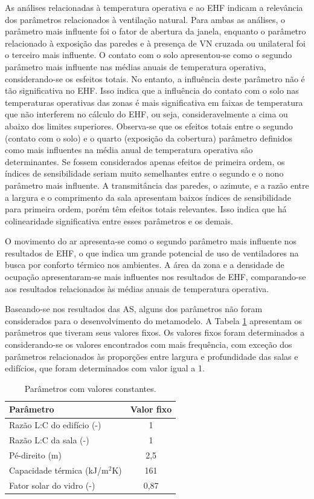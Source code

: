 \documentclass[brazil,hardcopy,openany,a4paper]{ufscthesis}
\begin{document}
	As análises relacionadas à temperatura operativa e ao EHF indicam a relevância dos parâmetros relacionados à ventilação natural. Para ambas as análises, o parâmetro mais influente foi o fator de abertura da janela, enquanto o parâmetro relacionado à exposição das paredes e à presença de VN cruzada ou unilateral foi o terceiro mais influente. 
	O contato com o solo apresentou-se como o segundo parâmetro mais influente nas médias anuais de temperatura operativa, considerando-se os esfeitos totais. No entanto, a influência deste parâmetro não é tão significativa no EHF. Isso indica que a influência do contato com o solo nas temperaturas operativas das zonas é mais significativa em faixas de temperatura que não interferem no cálculo do EHF, ou seja, consideravelmente a cima ou abaixo dos limites superiores.
	Observa-se que os efeitos totais entre o segundo (contato com o solo) e o quarto (exposição da cobertura) parâmetro definidos como mais influentes na média anual de temperatura operativa são determinantes. Se fossem considerados apenas efeitos de primeira ordem, os índices de sensibilidade seriam muito semelhantes entre o segundo e o nono parâmetro mais influente.
	A transmitância das paredes, o azimute, e a razão entre a largura e o comprimento da sala apresentam baixos índices de sensibilidade para primeira ordem, porém têm efeitos totais relevantes. Isso indica que há colinearidade significativa entre esses parâmetros e os demais.
		
	O movimento do ar apresenta-se como o segundo parâmetro mais influente nos resultados de EHF, o que indica um grande potencial de uso de ventiladores na busca por conforto térmico nos ambientes. 
	A área da zona e a densidade de ocupação apresentaram-se mais influentes nos resultados de EHF, comparando-se aos resultados relacionados às médias anuais de temperatura operativa.
	
	Baseando-se nos resultados das AS, alguns dos parâmetros não foram considerados para o desenvolvimento do metamodelo. A Tabela \ref{table:param_fixed} apresentam os parâmetros que tiveram seus valores fixos. Os valores fixos foram determinados a considerando-se os valores encontrados com mais frequência, com exceção dos parâmetros relacionados às proporções entre largura e profundidade das salas e edifícios, que foram determinados com valor igual a 1. 
	
	\begin{table}[H]		
		\centering
		\caption{Parâmetros com valores constantes.}
		\label{table:param_fixed}
		\begin{tabular}{|l |c |}
			\hline
			\textbf{Parâmetro} & Valor fixo \\
			\hline
			Razão L:C do edifício (-) & 1 \\
			\hline
			Razão L:C da sala (-) & 1 \\
			\hline
			Pé-direito (m) & 2,5 \\
			\hline
			Capacidade térmica (kJ/m$^2$K) & 161 \\
			\hline
			Fator solar do vidro (-) & 0,87 \\
			\hline
		\end{tabular}
	\end{table}
	
\end{document}
